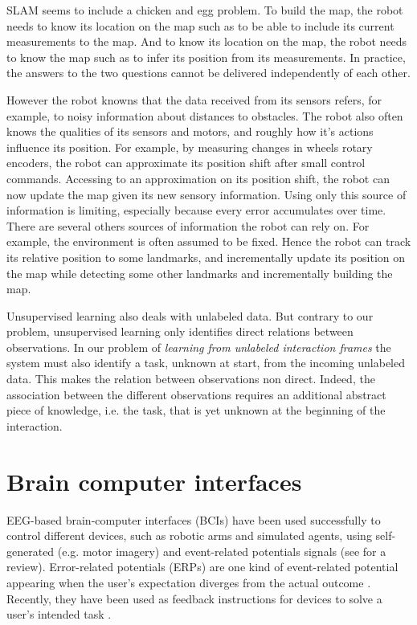 SLAM seems to include a chicken and egg problem. To build the map, the robot needs to know its location on the map such as to be able to include its current measurements to the map. And to know its location on the map, the robot needs to know the map such as to infer its position from its measurements. In practice, the answers to the two questions cannot be delivered independently of each other.

However the robot knowns that the data received from its sensors refers, for example, to noisy information about distances to obstacles. The robot also often knows the qualities of its sensors and motors, and roughly how it's actions influence its position. For example, by measuring changes in wheels rotary encoders, the robot can approximate its position shift after small control commands. Accessing to an approximation on its position shift, the robot can now update the map given its new sensory information. Using only this source of information is limiting, especially because every error accumulates over time. There are several others sources of information the robot can rely on. For example, the environment is often assumed to be fixed. Hence the robot can track its relative position to some landmarks, and incrementally update its position on the map while detecting some other landmarks and incrementally building the map.

\transition

Unsupervised learning also deals with unlabeled data. But contrary to our problem, unsupervised learning only identifies direct relations between observations. In our problem of \emph{learning from unlabeled interaction frames} the system must also identify a task, unknown at start, from the incoming unlabeled data. This makes the relation between observations non direct. Indeed, the association between the different observations requires an additional abstract piece of knowledge, i.e. the task, that is yet unknown at the beginning of the interaction.

\section{Brain computer interfaces}

EEG-based brain-computer interfaces (BCIs) have been used successfully to control different devices, such as robotic arms and simulated agents, using self-generated (e.g. motor imagery) and event-related potentials signals (see \cite{millan10} for a review). Error-related potentials (ERPs) are one kind of event-related potential appearing when the user's expectation diverges from the actual outcome \cite{Falkenstein00,chavarriaga2014errare}. Recently, they have been used as feedback instructions for devices to solve a user's intended task \cite{chavarriaga2010learning,iturrate13}.

